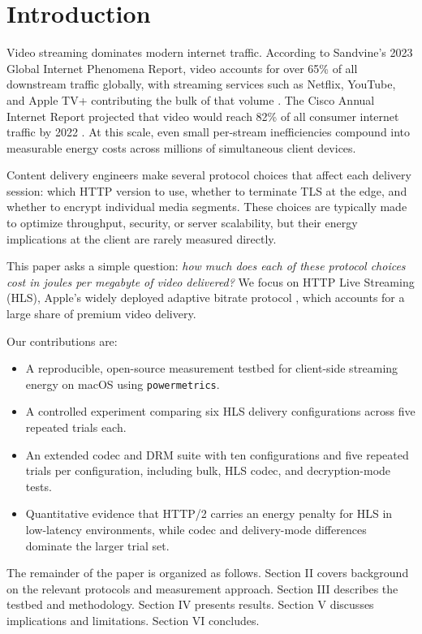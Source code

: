 \documentclass[conference]{IEEEtran}
\begin{document}
\section{Introduction}

Video streaming dominates modern internet traffic. According to Sandvine's 2023 Global
Internet Phenomena Report, video accounts for over 65\% of all downstream traffic
globally, with streaming services such as Netflix, YouTube, and Apple TV+ contributing
the bulk of that volume \cite{b_sandvine}. The Cisco Annual Internet Report projected
that video would reach 82\% of all consumer internet traffic by 2022 \cite{b_cisco}.
At this scale, even small per-stream inefficiencies compound into measurable energy
costs across millions of simultaneous client devices.

Content delivery engineers make several protocol choices that affect each delivery
session: which HTTP version to use, whether to terminate TLS at the edge, and whether
to encrypt individual media segments. These choices are typically made to optimize
throughput, security, or server scalability, but their energy implications at the client
are rarely measured directly.

This paper asks a simple question: \textit{how much does each of these protocol
choices cost in joules per megabyte of video delivered?} We focus on HTTP Live
Streaming (HLS), Apple's widely deployed adaptive bitrate protocol \cite{b_hls_rfc},
which accounts for a large share of premium video delivery.

Our contributions are:
\begin{itemize}
  \item A reproducible, open-source measurement testbed for client-side streaming
    energy on macOS using \texttt{powermetrics}.
  \item A controlled experiment comparing six HLS delivery configurations across five
    repeated trials each.
  \item An extended codec and DRM suite with ten configurations and five repeated
    trials per configuration, including bulk, HLS codec, and decryption-mode tests.
  \item Quantitative evidence that HTTP/2 carries an energy penalty for HLS in
    low-latency environments, while codec and delivery-mode differences dominate
    the larger trial set.
\end{itemize}

The remainder of the paper is organized as follows. Section II covers background on
the relevant protocols and measurement approach. Section III describes the testbed and
methodology. Section IV presents results. Section V discusses implications and
limitations. Section VI concludes.
\end{document}
